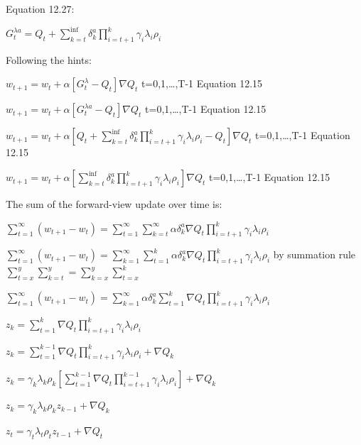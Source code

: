 \documentclass[11pt]{article}
\begin{document}
    \noindent Equation 12.27:

    \noindent $  G_{t}^{\lambda a}  =   Q_{t} + \sum_{k=t}^{\inf} \delta_{k}^{a} \prod_{i=t+1}^{k} \gamma_{i} \lambda_{i} \rho_{i} $

    \hfill \break
    \noindent Following the hints:

    \noindent $ w_{t+1} = w_{t} + \alpha [ G_{t}^{\lambda} - Q_{t}] \nabla Q_{t} $ t=0,1,\ldots,T-1 Equation 12.15

    \noindent $ w_{t+1} = w_{t} + \alpha [ G_{t}^{\lambda a} - Q_{t}] \nabla Q_{t} $ t=0,1,\ldots,T-1 Equation 12.15

    \noindent $ w_{t+1} = w_{t} + \alpha [Q_{t} + \sum_{k=t}^{\inf} \delta_{k}^{a} \prod_{i=t+1}^{k} \gamma_{i} \lambda_{i} \rho_{i} - Q_{t}] \nabla Q_{t} $ t=0,1,\ldots,T-1 Equation 12.15

    \noindent $ w_{t+1} = w_{t} + \alpha [\sum_{k=t}^{\inf} \delta_{k}^{a} \prod_{i=t+1}^{k} \gamma_{i} \lambda_{i} \rho_{i}] \nabla Q_{t} $ t=0,1,\ldots,T-1 Equation 12.15

    \hfill \break
    \noindent The sum of the forward-view update over time is:

    \noindent $ \sum_{t=1}^{\infty} (w_{t+1} - w_t) = \sum_{t=1}^{\infty} \sum_{k=t}^{\infty} \alpha  \delta_{k}^{a} \nabla Q_{t} \prod_{i=t+1}^{k} \gamma_{i} \lambda_{i} \rho_{i}  $

    \noindent $ \sum_{t=1}^{\infty} (w_{t+1} - w_t) = \sum_{k=1}^{\infty} \sum_{t=1}^{k} \alpha  \delta_{k}^{a} \nabla Q_{t} \prod_{i=t+1}^{k} \gamma_{i} \lambda_{i} \rho_{i}  $ by summation rule $ \sum_{t=x}^{y} \sum_{k=t}^{y} = \sum_{k=x}^{y} \sum_{t=x}^{k}  $

    \noindent $ \sum_{t=1}^{\infty} (w_{t+1} - w_t) = \sum_{k=1}^{\infty} \alpha  \delta_{k}^{a} \sum_{t=1}^{k} \nabla Q_{t} \prod_{i=t+1}^{k} \gamma_{i} \lambda_{i} \rho_{i}  $

    \noindent $ z_k = \sum_{t=1}^{k} \nabla Q_{t} \prod_{i=t+1}^{k} \gamma_{i} \lambda_{i} \rho_{i}  $

    \noindent $ z_k = \sum_{t=1}^{k-1} \nabla Q_{t} \prod_{i=t+1}^{k} \gamma_{i} \lambda_{i} \rho_{i} + \nabla Q_{k} $

    \noindent $ z_k = \gamma_{k} \lambda_{k} \rho_{k} [ \sum_{t=1}^{k-1} \nabla Q_{t} \prod_{i=t+1}^{k-1} \gamma_{i} \lambda_{i} \rho_{i} ] + \nabla Q_{k} $

    \noindent $ z_k = \gamma_{k} \lambda_{k} \rho_{k} z_{k-1} + \nabla Q_{k} $

    \noindent $ z_t = \gamma_{t} \lambda_{t} \rho_{t} z_{t-1} + \nabla Q_{t} $
\end{document}
